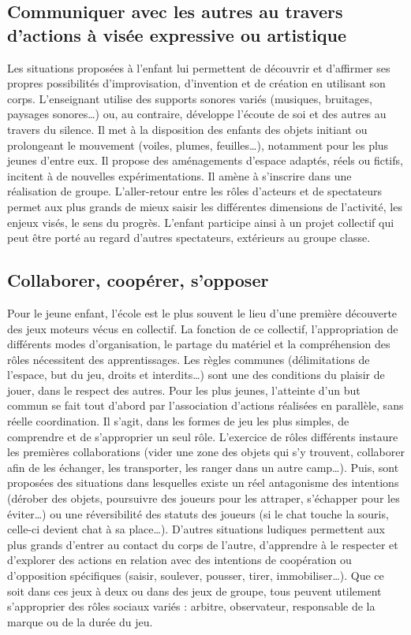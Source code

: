 \subsection{Communiquer avec les autres au travers d’actions à visée expressive ou artistique}
Les situations proposées à l’enfant lui permettent de découvrir et d’affirmer ses propres possibilités d’improvisation, d’invention et de création en utilisant son corps. L’enseignant utilise des supports sonores variés (musiques, bruitages, paysages sonores\dots) ou, au contraire, développe l’écoute de soi et des autres au travers du silence. Il met à la disposition des enfants des objets initiant ou prolongeant le mouvement (voiles, plumes, feuilles\dots), notamment pour les plus jeunes d’entre eux. Il propose des aménagements d’espace adaptés, réels ou fictifs, incitent à de nouvelles expérimentations. Il amène à s’inscrire dans une réalisation de groupe. L’aller-retour entre les rôles d’acteurs et de spectateurs permet aux plus grands de mieux saisir les différentes dimensions de l’activité, les enjeux visés, le sens du progrès. L’enfant participe ainsi à un projet collectif qui peut être porté au regard d’autres spectateurs, extérieurs au groupe classe.

\subsection{Collaborer, coopérer, s’opposer}
Pour le jeune enfant, l’école est le plus souvent le lieu d’une première découverte des jeux moteurs vécus en collectif. La fonction de ce collectif, l’appropriation de différents modes d’organisation, le partage du matériel et la compréhension des rôles nécessitent des apprentissages. Les règles communes (délimitations de l’espace, but du jeu, droits et interdits\dots) sont une des conditions du plaisir de jouer, dans le respect des autres. 
Pour les plus jeunes, l’atteinte d’un but commun se fait tout d’abord par l’association d’actions réalisées en parallèle, sans réelle coordination. Il s’agit, dans les formes de jeu les plus simples, de comprendre et de s’approprier un seul rôle. L’exercice de rôles différents instaure les premières collaborations (vider une zone des objets qui s’y trouvent, collaborer afin de les échanger, les transporter, les ranger dans un autre camp\dots). Puis, sont proposées des situations dans lesquelles existe un réel antagonisme des intentions (dérober des objets, poursuivre des joueurs pour les attraper, s’échapper pour les éviter\dots) ou une réversibilité des statuts des joueurs (si le chat touche la souris, celle-ci devient chat à sa place\dots). 
D’autres situations ludiques permettent aux plus grands d’entrer au contact du corps de l’autre, d’apprendre à le respecter et d’explorer des actions en relation avec des intentions de coopération ou d’opposition spécifiques (saisir, soulever, pousser, tirer, immobiliser\dots). Que ce soit dans ces jeux à deux ou dans des jeux de groupe, tous peuvent utilement s’approprier des rôles sociaux variés : arbitre, observateur, responsable de la marque ou de la durée du jeu. 

